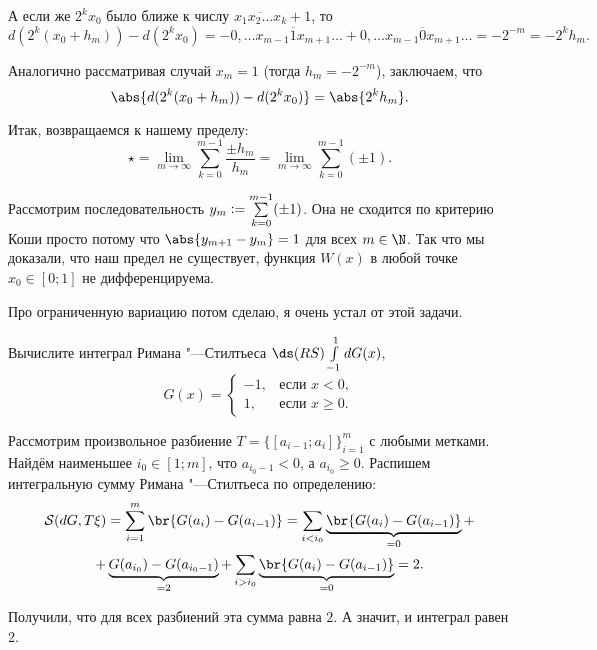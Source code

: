 \begin{solution}
    А если же $2^kx_0$ было ближе к числу $\overline{x_1x_2\ldots x_k} + 1$, то
    \[
        d(2^k(x_0 + h_m)) - d(2^kx_0) = -0{,}\overline{\ldots x_{m - 1}1x_{m + 1}\ldots} + 0{,}\overline{\ldots x_{m - 1}0x_{m + 1}\ldots} = -2^{-m} = -2^kh_m.
    \]

    Аналогично рассматривая случай $x_m = 1$ (тогда $h_m = -2^{-m}$), заключаем, что \[\abs{d(2^{k}(x_0 + h_m)) - d(2^kx_0)} = \abs{2^kh_m}.\]

    Итак, возвращаемся к нашему пределу:
    \[
        \star = \lim_{m \to \infty}\sum_{k = 0}^{m - 1}\frac{\pm h_m}{h_m} = \lim_{m \to \infty}\sum_{k = 0}^{m - 1}(\pm 1).
    \]

    Рассмотрим последовательность $y_m \vcentcolon = \sum\limits_{k = 0}^{m - 1}(\pm 1)$. Она не сходится по критерию Коши просто потому что $\abs{y_{m + 1} - y_m} = 1$ для всех $m \in \N$. Так что мы доказали, что наш предел не существует, функция $W(x)$ в любой точке $x_0 \in [0; 1]$ не дифференцируема.

    Про ограниченную вариацию потом сделаю, я очень устал от этой задачи.
\end{solution}

\begin{problem}[30$^\circ$]
    Вычислите интеграл Римана "---Стилтьеса $\ds(RS)\int\limits_{-1}^1dG(x)$,
    \[
        G(x) =
        \begin{cases}
            -1,&\text{если $x < 0$},\\
            1,&\text{если $x \geqslant 0$}.
        \end{cases}
    \]
\end{problem}

\begin{solution}
    Рассмотрим произвольное разбиение $T = \{[a_{i - 1}; a_i]\}_{i = 1}^m$ с любыми метками. Найдём наименьшее $i_0 \in [1; m]$, что $a_{i_0 - 1} < 0$, а $a_{i_0} \geqslant 0$. Распишем интегральную сумму Римана "---Стилтьеса по определению:
    \begin{multline*}
        \mathcal{S}(dG, T\xi) = \sum_{i = 1}^m\br{G(a_i) - G(a_{i - 1})} = \sum_{i < i_0}\underbrace{\br{G(a_i) - G(a_{i - 1})}}_{= 0} +\\ + \underbrace{G(a_{i_0}) - G(a_{i_0 - 1})}_{= 2} + \sum_{i > i_0}\underbrace{\br{G(a_i) - G(a_{i - 1})}}_{= 0} = 2.
    \end{multline*}

    Получили, что для всех разбиений эта сумма равна $2$. А значит, и интеграл равен $2$.
\end{solution}

